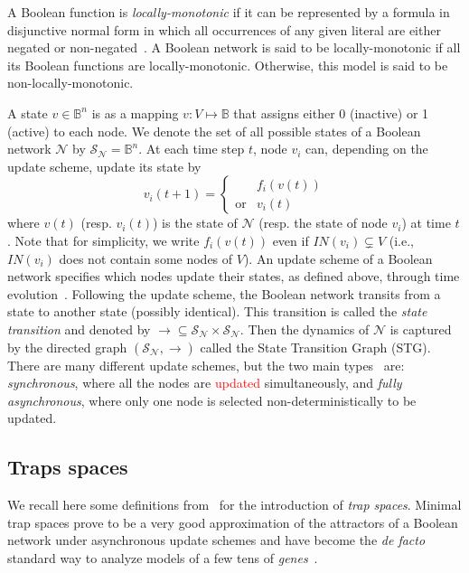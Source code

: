 \documentclass[preprint,12pt]{elsarticle}
\newcommand{\change}[1]{\textcolor{red}{#1}}
\newcommand{\IN}{\mathit{IN}}
\begin{document}
A Boolean function is \emph{locally-monotonic} if it can be represented by a formula in disjunctive normal form in which all occurrences of any given literal are either negated or non-negated~\cite{Paulev2020}.
A Boolean network is said to be locally-monotonic if all its Boolean functions are locally-monotonic.
Otherwise, this model is said to be non-locally-monotonic.

A state \(v \in \mathbb{B}^{n}\) is as a mapping \(v \colon V \mapsto \mathbb{B}\) that assigns either 0 (inactive) or 1 (active) to each node.
We denote the set of all possible states of a Boolean network \(\mathcal{N}\) by \(\mathcal{S}_{\mathcal{N}} = \mathbb{B}^n\).
At each time step \(t\), node \(v_i\) can, depending on the update scheme, update its state by
\[v_i(t + 1) =
  \begin{cases}
    &f_i(v(t))\\
    \text{or} &v_i(t)
  \end{cases}
\]
where \(v(t)\) (resp. \(v_i(t)\)) is the state of \(\mathcal{N}\) (resp. the state of node \(v_i\)) at time \(t\).
Note that for simplicity, we write \(f_i(v(t))\) even if \(\IN(v_i) \subsetneq V\) (i.e., \(\IN(v_i)\) does not contain some nodes of \(V\)).
An update scheme of a Boolean network specifies which nodes update their states, as defined above, through time evolution~\cite{thomas1991regulatory}.
Following the update scheme, the Boolean network transits from a state to another state (possibly identical).
This transition is called the \emph{state transition} and denoted by \(\rightarrow \subseteq \mathcal{S}_{\mathcal{N}} \times \mathcal{S}_{\mathcal{N}}\).
Then the dynamics of \(\mathcal{N}\) is captured by the directed graph \((\mathcal{S}_{\mathcal{N}}, \rightarrow)\) called the State Transition Graph (STG).
There are many different update schemes, but the two main types~\cite{thomas1991regulatory} are: \emph{synchronous}, where all the nodes are \change{updated} simultaneously, and \emph{fully asynchronous}, where only one node is selected non-deterministically to be updated.

\subsection{Traps spaces}

We recall here some definitions from~\cite{klarner2015computing} for the introduction of \emph{trap spaces}.
Minimal trap spaces prove to be a very good approximation of the attractors of a Boolean network under asynchronous update schemes and have become the \emph{de facto} standard way to analyze models of a few tens of \emph{genes}~\cite{klarner2017pyboolnet,cifuentes2020control}.
\end{document}
